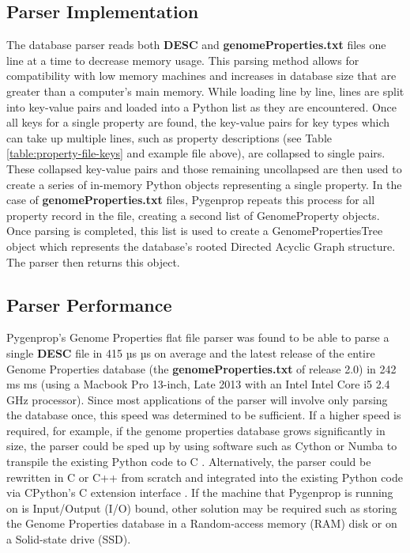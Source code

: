\subsection{Parser Implementation}

The database parser reads both \textbf{DESC} and \textbf{genomeProperties.txt} files one line at a time to decrease memory usage. This parsing method allows for compatibility with low memory machines and increases in database size that are greater than a computer's main memory. While loading line by line, lines are split into key-value pairs and loaded into a Python list as they are encountered. Once all keys for a single property are found, the key-value pairs for key types which can take up multiple lines, such as property descriptions (see Table \ref{table:property-file-keys} and example file above), are collapsed to single pairs. These collapsed key-value pairs and those remaining uncollapsed are then used to create a series of in-memory Python objects representing a single property. In the case of \textbf{genomeProperties.txt} files, Pygenprop repeats this process for all property record in the file, creating a second list of GenomeProperty objects. Once parsing is completed, this list is used to create a GenomePropertiesTree object which represents the database's rooted Directed Acyclic Graph structure. The parser then returns this object.

\subsection{Parser Performance}

Pygenprop's Genome Properties flat file parser was found to be able to parse a single \textbf{DESC} file in 415 µs  µs on average and the latest release of the entire Genome Properties database (the \textbf{genomeProperties.txt} of release 2.0) in 242 ms  ms (using a Macbook Pro 13-inch, Late 2013 with an Intel Intel Core i5 2.4 GHz processor). Since most applications of the parser will involve only parsing the database once, this speed was determined to be sufficient. If a higher speed is required, for example, if the genome properties database grows significantly in size, the parser could be sped up by using software such as Cython \cite{behnel2010cython} or Numba \cite{lam2015numba} to transpile the existing Python code to C \cite{kernighan2006c}. Alternatively, the parser could be rewritten in C or C++ \cite{ISO:1998:IIP} from scratch and integrated into the existing Python code via CPython's C extension interface \cite{van1995python}. If the machine that Pygenprop is running on is Input/Output (I/O) bound, other solution may be required such as storing the Genome Properties database in a Random-access memory (RAM) disk or on a Solid-state drive (SSD).


